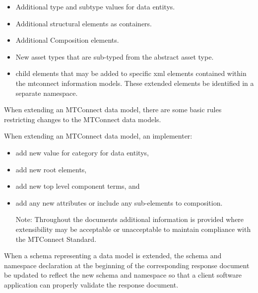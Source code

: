 \documentclass{mtconnect}	%
\begin{document}
\begin{itemize}

\item Additional \gls{type} and \gls{subtype} values for \glspl{data entity}.

\item Additional \glspl{structural element} as containers.

\item Additional Composition elements.

\item New \gls{asset} types that are sub-typed from the abstract \gls{asset} type.

\item \glspl{child element} that may be added to specific \gls{xml} elements contained within the \glspl{mtconnect information model}.  These extended elements \MUST be identified in a separate \gls{namespace}.

\end{itemize}

When extending an MTConnect \gls{data model}, there are some basic rules restricting changes to the MTConnect \glspl{data model}.

When extending an MTConnect \gls{data model}, an implementer:

\begin{itemize}

\item \MUSTNOT add new value for category for \glspl{data entity},

\item \MUSTNOT add new \glspl{root element},

\item \SHOULDNOT add new \gls{top level} \glspl{component term}, and

\item \MUSTNOT add any new attributes or include any sub-elements to \gls{composition}.

\begin{note}
Note:  Throughout the documents additional information is provided where extensibility may be acceptable or unacceptable to maintain compliance with the MTConnect Standard.

\end{note}

\end{itemize}

When a \gls{schema} representing a \gls{data model} is extended, the \gls{schema} and \gls{namespace} declaration at the beginning of the corresponding \gls{response document} \MUST be updated to reflect the new \gls{schema} and \gls{namespace} so that a client software application can properly validate the \gls{response document}.
\end{document}
